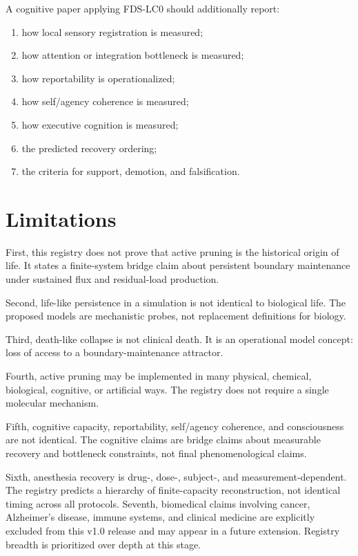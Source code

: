 \documentclass[10pt,a4paper,twocolumn,aps,prl]{revtex4-2}
\theoremstyle{claimstyle}
\theoremstyle{definition}
\newcommand{\LC}{FDS-LC0}
\begin{document}
A cognitive paper applying \LC{} should additionally report:
\begin{enumerate}
    \item how local sensory registration is measured;
    \item how attention or integration bottleneck is measured;
    \item how reportability is operationalized;
    \item how self/agency coherence is measured;
    \item how executive cognition is measured;
    \item the predicted recovery ordering;
    \item the criteria for support, demotion, and falsification.
\end{enumerate}

\section{Limitations}

First, this registry does not prove that active pruning is the historical origin of life. It states a finite-system bridge claim about persistent boundary maintenance under sustained flux and residual-load production.

Second, life-like persistence in a simulation is not identical to biological life. The proposed models are mechanistic probes, not replacement definitions for biology.

Third, death-like collapse is not clinical death. It is an operational model concept: loss of access to a boundary-maintenance attractor.

Fourth, active pruning may be implemented in many physical, chemical, biological, cognitive, or artificial ways. The registry does not require a single molecular mechanism.

Fifth, cognitive capacity, reportability, self/agency coherence, and consciousness are not identical. The cognitive claims are bridge claims about measurable recovery and bottleneck constraints, not final phenomenological claims.

Sixth, anesthesia recovery is drug-, dose-, subject-, and measurement-dependent. The registry predicts a hierarchy of finite-capacity reconstruction, not identical timing across all protocols. Seventh, biomedical claims involving cancer, Alzheimer's disease, immune systems, and clinical medicine are explicitly excluded from this v1.0 release and may appear in a future extension. Registry breadth is prioritized over depth at this stage.
\end{document}
